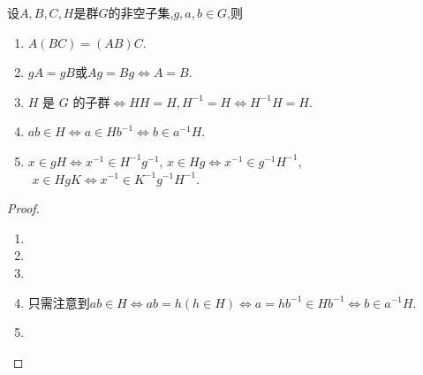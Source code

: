 \documentclass[../../main.tex]{subfiles}%
\begin{document}
\begin{theorem}\label{theorem:子群陪集的基本性质}
设$A,B,C,H$是群$G$的非空子集,$g,a,b\in G$,则
\begin{enumerate}[(1)]
\item\label{theorem:子群陪集的基本性质-1} $A(BC)=(AB)C$.

\item\label{theorem:子群陪集的基本性质-2} $gA=gB\text{或}Ag=Bg\iff A=B$.

\item\label{theorem:子群陪集的基本性质-3} \( H \) 是 \( G \) 的子群$\iff HH = H , H^{-1} = H\iff H^{-1}H = H$.

\item\label{theorem:子群陪集的基本性质-4} $ab\in H\iff a\in Hb^{-1}\iff b\in a^{-1}H$.

\item $x\in gH \iff x^{-1}\in H^{-1}g^{-1}$,$\,\,x\in Hg \iff x^{-1}\in g^{-1}H^{-1}$,$\,\,x\in HgK\iff x^{-1}\in K^{-1}g^{-1}H^{-1}$.
\end{enumerate}
\end{theorem}
\begin{proof}
\begin{enumerate}[(1)]
\item 

\item 

\item 

\item 只需注意到$ab\in H\Longleftrightarrow ab=h\left( h\in H \right) \Longleftrightarrow a=hb^{-1}\in Hb^{-1}\Longleftrightarrow b\in a^{-1}H$.

\item 
\end{enumerate}

\end{proof}
\end{document}
